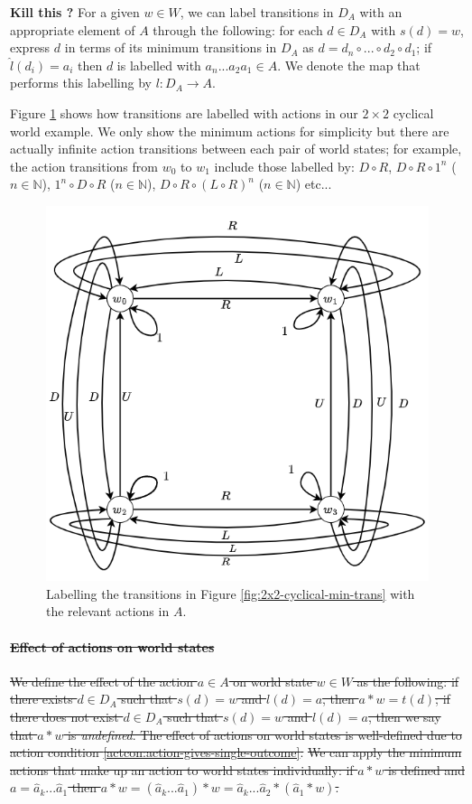 \begin{remark}
    \textbf{Kill this ?}
    For a given $w \in W$, we can label transitions in $D_{A}$ with an appropriate element of $A$ through the following: for each $d \in D_{A}$ with $s(d)=w$, express $d$ in terms of its minimum transitions in $D_{A}$ as $d = d_{n} \circ ... \circ d_{2} \circ d_{1}$; if $\hat{l}(d_{i}) = a_{i}$ then $d$ is labelled with $a_{n}...a_{2}a_{1} \in A$.
    We denote the map that performs this labelling by $l: D_{A} \to A$.
\end{remark}

Figure \ref{fig:2x2-cyclical-min-actions-standard} shows how transitions are labelled with actions in our $2 \times 2$ cyclical world example.
We only show the minimum actions for simplicity but there are actually infinite action transitions between each pair of world states; for example, the action transitions from $w_{0}$ to $w_{1}$ include those labelled by: $D \circ R$, $D \circ R \circ 1^{n}$ ($n \in \mathbb{N}$), $1^{n} \circ D \circ R$ ($n \in \mathbb{N}$), $D \circ R \circ (L \circ R)^{n}$ ($n \in \mathbb{N}$) etc...

\begin{figure}
    \centering
    \includegraphics[width=0.5\linewidth]{2MathematicalFramework/InitialFramework/Images/2x2-cyclical-min-actions.drawio.png}
    \caption{Labelling the transitions in Figure \ref{fig:2x2-cyclical-min-trans} with the relevant actions in $A$.}
    \label{fig:2x2-cyclical-min-actions-standard}
\end{figure}

\paragraph{\sout{Effect of actions on world states}}
\sout{
We define the effect of the action $a \in A$ on world state $w \in W$ as the following: if there exists $d \in D_{A}$ such that $s(d)=w$ and $l(d)=a$, then $a * w = t(d)$; if there does not exist $d \in D_{A}$ such that $s(d)=w$ and $l(d)=a$, then we say that $a * w$ is \textit{undefined}.
The effect of actions on world states is well-defined due to action condition \ref{actcon:action-gives-single-outcome}.
}
\sout{
We can apply the minimum actions that make up an action to world states individually: if $a * w$ is defined and $a = \hat{a}_{k}...\hat{a}_{1}$ then $a * w = (\hat{a}_{k}...\hat{a}_{1}) * w = \hat{a}_{k}...\hat{a}_{2} * (\hat{a}_{1} * w)$.
}

